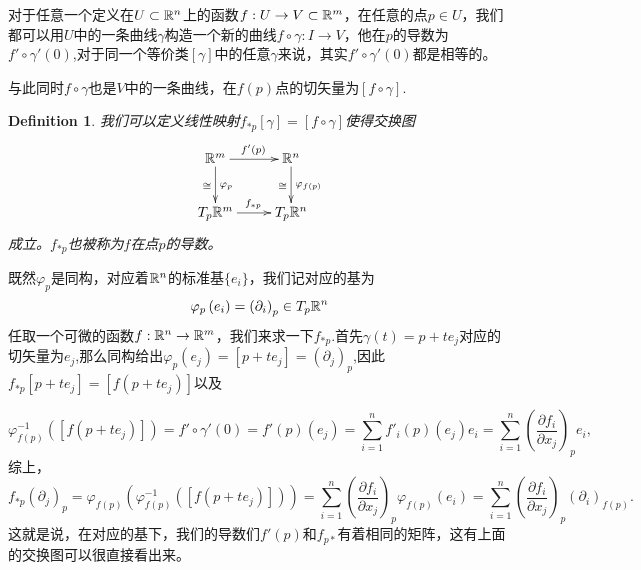 \documentclass[11pt]{extbook}
\theoremstyle{plain}%
\newtheorem{defi}{Definition}[section]%
\begin{document}
对于任意一个定义在$U\subset \mathbb{R}^n$上的函数$f:U\rightarrow V\subset \mathbb{R}^m$，在任意的点$p\in U$，我们都可以用$U$中的一条曲线$\gamma$构造一个新的曲线$f\circ \gamma:I\to V$，他在$p$的导数为$f'\circ \gamma'(0)$,对于同一个等价类$[\gamma]$中的任意$\gamma$来说，其实$f'\circ \gamma'(0)$都是相等的。

与此同时$f\circ \gamma$也是$V$中的一条曲线，在$f(p)$点的切矢量为$\left[f\circ \gamma\right]$.
\begin{defi}
	我们可以定义线性映射$f_{*p}[\gamma]=\left[f\circ \gamma\right]$使得交换图
	\[
		\xymatrix{
		\rr^m\ar[d]_\cong^{\varphi_p}\ar[r]^{f'(p)}&\rr^n\ar[d]_\cong^{\varphi_{f(p)}}\\
		T_{p}\rr^m\ar[r]^{f_{*p}}&T_{p}\rr^n
		}
	\]
成立。$f_{*p}$也被称为$f$在点$p$的导数。
\end{defi}
既然$\varphi_p$是同构，对应着$\mathbb{R}^n$的标准基$\{e_i\}$，我们记对应的基为
\[
	\varphi_p\left(e_i\right)=\left(\partial_i\right)_p\in T_p\mathbb{R}^n
\]
任取一个可微的函数$f:\mathbb{R}^n\to\mathbb{R}^m$，我们来求一下$f_{*p}$.首先$\gamma(t)=p+te_j$对应的切矢量为$e_j$,那么同构给出$\varphi_p\left(e_j\right)=\left[p+te_j\right]=\left(\partial_j\right)_p$,因此$f_{*p}\left[p+te_j\right]=\left[f(p+te_j)\right]$以及

\[
	\varphi_{f(p)}^{-1}\left(\left[f(p+te_j)\right]\right)=f'\circ \gamma'(0)=f'(p)\left(e_j\right)=\sum_{i=1}^n f'_i(p)\left(e_j\right)e_i=\sum_{i=1}^n \left(\frac{\partial f_i}{\partial x_j}\right)_p e_i,
\]
综上，
\[
	f_{*p}\left(\partial_j\right)_p=\varphi_{f(p)}\left(\varphi_{f(p)}^{-1}\left(\left[f(p+te_j)\right]\right)\right)=\sum_{i=1}^n \left(\frac{\partial f_i}{\partial x_j}\right)_p\varphi_{f(p)}(e_i) =\sum_{i=1}^n\left(\frac{\partial f_i}{\partial x_j}\right)_p\left(\partial_i\right)_{f(p)}.
\]
这就是说，在对应的基下，我们的导数们$f'(p)$和$f_{p*}$有着相同的矩阵，这有上面的交换图可以很直接看出来。
\end{document}

